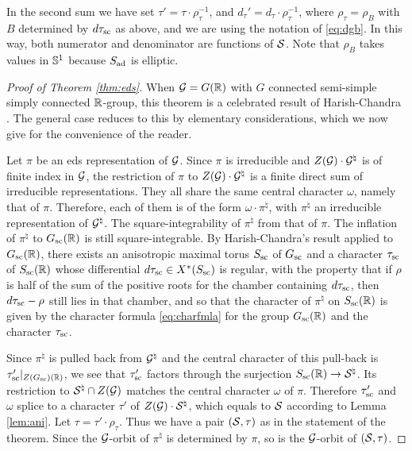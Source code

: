 \documentclass{article}
\theoremstyle{definition}
\numberwithin{equation}{section}
\renewcommand{\-}{\hyp{}}
\begin{document}
In the second sum we have set $\tau'=\tau \cdot \rho_\tau^{-1}$, and $d_\tau'=d_\tau \cdot \rho_\tau^{-1}$, where $\rho_\tau=\rho_B$ with $B$ determined by $d\tau_{\textrm{sc}}$ as above, and we are using the notation of \eqref{eq:dgb}. In this way, both numerator and denominator are functions of $\mathcal{S}$. Note that $\rho_B$ takes values in $\mathbb{S}^1$ because $S_{\textrm{ad}}$ is elliptic.

\begin{proof}[Proof of Theorem \ref{thm:eds}]
	When $\mathcal{G}=G(\mathbb{R})$ with $G$ connected semi-simple simply connected $\mathbb{R}$-group, this theorem is a celebrated result of Harish-Chandra \cite{HCDSI}. The general case reduces to this by elementary considerations, which we now give for the convenience of the reader.

	Let $\pi$ be an eds representation of $\mathcal{G}$. Since $\pi$ is irreducible and $Z(\mathcal{G})\cdot \mathcal{G}^\natural$ is of finite index in $\mathcal{G}$, the restriction of $\pi$ to $Z(\mathcal{G})\cdot \mathcal{G}^\natural$ is a finite direct sum of irreducible representations. They all share the same central character $\omega$, namely that of $\pi$. Therefore, each of them is of the form $\omega \cdot \pi^\natural$, with $\pi^\natural$ an irreducible representation of $\mathcal{G}^\natural$. The square-integrability of $\pi^\natural$ from that of $\pi$. The inflation of $\pi^\natural$ to $G_{\textrm{sc}}(\mathbb{R})$ is still square-integrable. By Harish-Chandra's result applied to $G_{\textrm{sc}}(\mathbb{R})$, there exists an anisotropic maximal torus $S_{\textrm{sc}}$ of $G_{\textrm{sc}}$ and a character $\tau_{\textrm{sc}}$ of $S_{\textrm{sc}}(\mathbb{R})$ whose differential $d\tau_{\textrm{sc}} \in X^*(S_{\textrm{sc}})$ is regular, with the property that if $\rho$ is half of the sum of the positive roots for the chamber containing $d\tau_{\textrm{sc}}$, then $d\tau_{\textrm{sc}}-\rho$ still lies in that chamber, and so that the character of $\pi^\natural$ on $S_{\textrm{sc}}(\mathbb{R})$ is given by the character formula \eqref{eq:charfmla} for the group $G_{\textrm{sc}}(\mathbb{R})$ and the character $\tau_{\textrm{sc}}$.
	
	Since $\pi^\natural$ is pulled back from $\mathcal{G}^\natural$ and the central character of this pull-back is $\tau'_{\textrm{sc}}|_{Z(G_{\textrm{sc}})(\mathbb{R})}$, we see that $\tau'_{\textrm{sc}}$ factors through the surjection $S_{\textrm{sc}}(\mathbb{R}) \to \mathcal{S}^\natural$. Its restriction to $\mathcal{S}^\natural \cap Z(\mathcal{G})$ matches the central character $\omega$ of $\pi$. Therefore $\tau'_{\textrm{sc}}$ and $\omega$ splice to a character $\tau'$ of $Z(\mathcal{G}) \cdot \mathcal{S}^\natural$, which equals to $\mathcal{S}$ according to Lemma \ref{lem:ani}. Let $\tau=\tau' \cdot \rho_\tau$. Thus we have a pair $(\mathcal{S},\tau)$ as in the statement of the theorem. Since the $\mathcal{G}$-orbit of $\pi^\natural$ is determined by $\pi$, so is the $\mathcal{G}$-orbit of $(\mathcal{S},\tau)$.


\end{proof}
\end{document}
